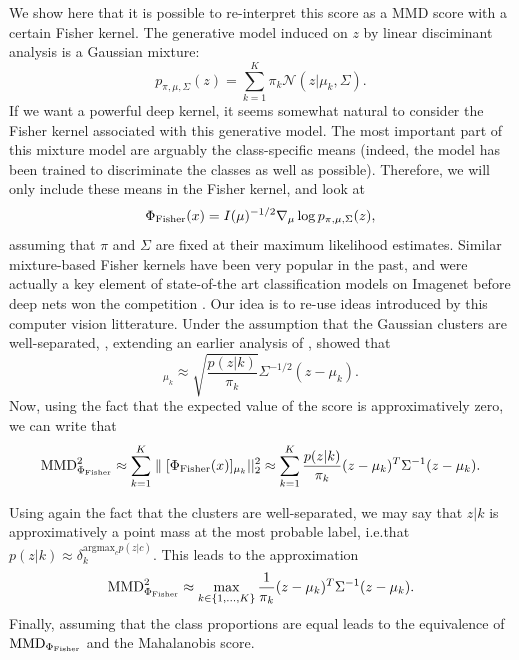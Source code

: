 {We show here that it is possible to re-interpret this score as a MMD score with a certain Fisher kernel. 
The generative model induced on $z$ by linear disciminant analysis is a Gaussian mixture:
\begin{equation}
    p_{\pi, \mu , \Sigma }(z) = \sum_{k=1}^K \pi_k \mathcal{N}(z | \mu_k, \Sigma).
\end{equation}
If we want a powerful deep kernel, it seems somewhat natural to consider the Fisher kernel associated with this generative model. The most important part of this mixture model are arguably the class-specific means (indeed, the model has been trained to discriminate the classes as well as possible). Therefore, we will only include these means in the Fisher kernel, and look at
\begin{equation}
	\Phi_\textup{Fisher} (x) = I(\mu)^{-1/2} \nabla_\mu  \log p_{\pi, \mu , \Sigma }(z),
\end{equation}
assuming that $\pi$ and $\Sigma$ are fixed at their maximum likelihood estimates. Similar mixture-based Fisher kernels have been very popular in the past, and were actually a key element of state-of-the art classification models on Imagenet before deep nets won the competition \parencite{perronnin_improving_2010}. Our idea is to re-use ideas introduced by this computer vision litterature. Under the assumption that the Gaussian clusters are well-separated, \textcite{tanaka_fisher_2013}, extending an earlier analysis of \textcite[Appendix A]{sanchez_image_2013}, showed that
\begin{equation}
	[\Phi_\textup{Fisher} (x)]_{\mu_k} \approx \sqrt{\frac{p(z|k)}{\pi_k }}  \Sigma^{-1/2} (z - \mu_k).
\end{equation}
Now, using the fact that the expected value of the score is approximatively zero, we can write that
\begin{equation}
    \textup{MMD}_{\Phi_\textup{Fisher}}^2 \approx \sum_{k=1}^K  \parallel [\Phi_\textup{Fisher} (x)]_{\mu_k} ||_2^2 \approx \sum_{k=1}^K \frac{p(z|k)}{\pi_k} (z - \mu_k)^T \Sigma^{-1} (z - \mu_k).
\end{equation}



Using again the fact that the clusters are well-separated, we may say that $z|k$ is approximatively a point mass at the most probable label,  i.e.\@ that $p(z|k) \approx \delta_k^{\text{argmax}_c p(z|c)}$. This leads to the approximation 
\begin{equation}
    \textup{MMD}_{\Phi_\textup{Fisher}}^2 \approx \max_{k \in \{1,...,K\}} \frac{1}{\pi_k} (z - \mu_k)^T \Sigma^{-1} (z - \mu_k).
\end{equation}
Finally, assuming that the class proportions are equal leads to the equivalence of $\textup{MMD}_{\Phi_\textup{Fisher}}$ and the Mahalanobis score.




}
